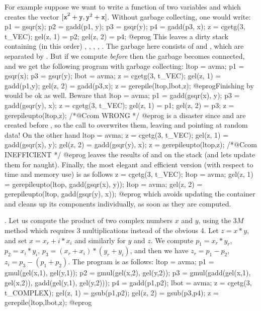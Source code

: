For example suppose we want to write a function of two  variables
 and  which creates the vector ${\tt [x}^2+{\tt y},
{\tt y}^2+{\tt x]}$. Without garbage collecting, one would write:
%
\bprog
  p1 = gsqr(x); p2 = gadd(p1, y);
  p3 = gsqr(y); p4 = gadd(p3, x); z = cgetg(3, t_VEC);
  gel(z, 1) = p2;
  gel(z, 2) = p4;
@eprog\noindent
This leaves a dirty stack containing (in this order) , ,
, , . The garbage here consists of  and
, which are separated by . But if we compute 
\emph{before}  then the garbage becomes connected, and we get the
following program with garbage collecting:
%
\bprog
  ltop = avma; p1 = gsqr(x); p3 = gsqr(y);
  lbot = avma; z = cgetg(3, t_VEC);
  gel(z, 1) = gadd(p1,y);
  gel(z, 2) = gadd(p3,x); z = gerepile(ltop,lbot,z);
@eprog\noindent Finishing by  would be ok as
well. Beware that
\bprog
  ltop = avma; p1 = gadd(gsqr(x), y); p3 = gadd(gsqr(y), x);
  z = cgetg(3, t_VEC);
  gel(z, 1) = p1;
  gel(z, 2) = p3; z = gerepileupto(ltop,z); /*@Ccom WRONG */
@eprog\noindent
is a disaster since  and  are created before
, so the call to  overwrites them, leaving
 and  pointing at random data! On the other
hand
\bprog
  ltop = avma; z = cgetg(3, t_VEC);
  gel(z, 1) = gadd(gsqr(x), y);
  gel(z, 2) = gadd(gsqr(y), x); z = gerepileupto(ltop,z); /*@Ccom INEFFICIENT */
@eprog\noindent
leaves the results of  and  on the stack (and
lets  update them for naught). Finally, the most elegant
and efficient version (with respect to time and memory use) is as follows
\bprog
  z = cgetg(3, t_VEC);
  ltop = avma; gel(z, 1) = gerepileupto(ltop, gadd(gsqr(x), y));
  ltop = avma; gel(z, 2) = gerepileupto(ltop, gadd(gsqr(y), x));
@eprog\noindent
which avoids updating the container  and cleans up its components
individually, as soon as they are computed.

. Let us compute the product of two complex
numbers $x$ and $y$, using the $3M$ method which requires 3 multiplications
instead of the obvious 4. Let $z = x*y$, and set $x = x_r + i*x_i$ and
similarly for $y$ and $z$. We compute $p_1 = x_r*y_r$, $p_2=x_i*y_i$,
$p_3=(x_r+x_i)*(y_r+y_i)$, and then we have $z_r=p_1-p_2$,
$z_i=p_3-(p_1+p_2)$. The program is as follows:
%
\bprog
ltop = avma;
p1 = gmul(gel(x,1), gel(y,1));
p2 = gmul(gel(x,2), gel(y,2));
p3 = gmul(gadd(gel(x,1), gel(x,2)), gadd(gel(y,1), gel(y,2)));
p4 = gadd(p1,p2);
lbot = avma; z = cgetg(3, t_COMPLEX);
gel(z, 1) = gsub(p1,p2);
gel(z, 2) = gsub(p3,p4); z = gerepile(ltop,lbot,z);
@eprog

